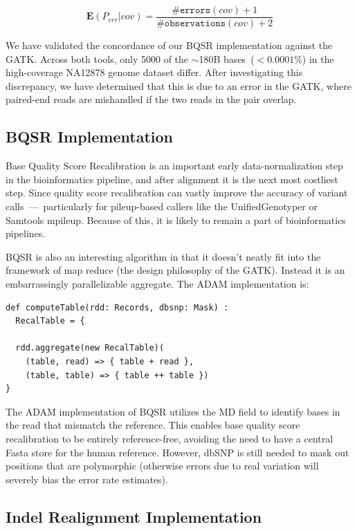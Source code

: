 \documentclass[masters]{ucbthesis}
\begin{document}
\begin{enumerate}
\begin{equation}
\label{eqn:bqsrerr}
\mathbf{E}(P_{err}|{cov}) = \frac{\texttt{\#errors}(cov) + 1}{\texttt{\#observations}(cov) + 2}
\end{equation}

We have validated the concordance of our BQSR implementation against the GATK. Across both tools, only 5000
of the $\sim$180B bases~($<0.0001\%$) in the high-coverage NA12878 genome dataset differ. After investigating
this discrepancy, we have determined that this is due to an error in the GATK, where paired-end reads are
mishandled if the two reads in the pair overlap.
\end{enumerate}

\subsection{BQSR Implementation}
\label{sec:bqsr-implementation}

Base Quality Score Recalibration is an important early data-normalization step in the bioinformatics pipeline, and after alignment
it is the next most costliest step. Since quality score recalibration can vastly improve the accuracy of variant calls~---~particularly for
pileup-based callers like the UnifiedGenotyper or Samtools mpileup. Because of this, it is likely to remain a part of bioinformatics pipelines.

BQSR is also an interesting algorithm in that it doesn't neatly fit into the framework of map reduce (the design philosophy of the GATK).
Instead it is an embarrassingly parallelizable aggregate. The ADAM implementation is:

\begin{lstlisting}
def computeTable(rdd: Records, dbsnp: Mask) :
  RecalTable = {
  
  rdd.aggregate(new RecalTable)(
    (table, read) => { table + read },
    (table, table) => { table ++ table })
}
\end{lstlisting}

The ADAM implementation of BQSR utilizes the MD field to identify bases in the read that mismatch the reference. This enables
base quality score recalibration to be entirely reference-free, avoiding the need to have a central Fasta store for the human
reference. However, dbSNP is still needed to mask out positions that are polymorphic (otherwise errors due to real variation will
severely bias the error rate estimates).

\subsection{Indel Realignment Implementation}
\label{sec:indel-realignment-implementation}
\end{document}
